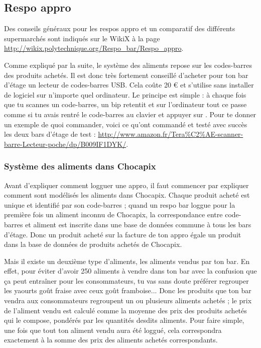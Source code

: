 \documentclass[12pt,french]{article}
\begin{document}
\subsection{Respo appro}

Des conseils généraux pour les respos appro et un comparatif des différents supermarchés sont indiqués sur le WikiX à la page \url{http://wikix.polytechnique.org/Respo_bar/Respo_appro}.

Comme expliqué par la suite, le système des aliments repose sur les codes-barres des produits achetés. Il est donc très fortement conseillé d'acheter pour ton bar d'étage un lecteur de codes-barres USB. Cela coûte 20 € et s'utilise sans installer de logiciel sur n'importe quel ordinateur. Le principe est simple : à chaque fois que tu scannes un code-barres, un bip retentit et sur l'ordinateur tout ce passe comme si tu avais rentré le code-barres au clavier et appuyer sur . Pour te donner un exemple de quoi commander, voici ce qu'ont commandé et testé avec succès les deux bars d'étage de test : \url{http://www.amazon.fr/Tera%C2%AE-scanner-barre-Lecteur-poche/dp/B009IF1DYK/}.

\subsubsection{Système des aliments dans Chocapix}

Avant d'expliquer comment logguer une appro, il faut commencer par expliquer comment sont modélisés les aliments dans Chocapix. Chaque produit acheté est unique et identifié par son code-barres ; quand un respo bar loggue pour la première fois un aliment inconnu de Chocapix, la correspondance entre code-barres et aliment est inscrite dans une base de données commune à tous les bars d'étage. Donc un produit acheté sur la facture de ton appro égale un produit dans la base de données de produits achetés de Chocapix.

Mais il existe un deuxième type d'aliments, les aliments vendus par ton bar. En effet, pour éviter d'avoir 250 aliments à vendre dans ton bar avec la confusion que ça peut entraîner pour les consommateurs, tu vas sans doute préférer regrouper les yaourts goût fraise avec ceux goût framboise... Donc les produits que ton bar vendra aux consommateurs regroupent un ou plusieurs aliments achetés ; le prix de l'aliment vendu est calculé comme la moyenne des prix des produits achetés qui le compose, pondérés par les quantités desdits aliments. Pour faire simple, une fois que tout ton aliment vendu aura été loggué, cela correspondra exactement à la somme des prix des aliments achetés correspondants.
\end{document}
